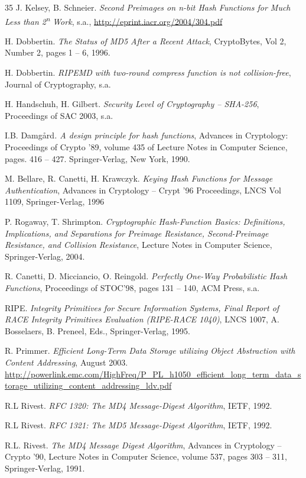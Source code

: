 \begin{thebibliography}{35}
J. Kelsey, B. Schneier. \emph{Second Preimages on n-bit Hash Functions
for Much Less than 2}\textsuperscript{\emph{n}} \emph{Work}, s.a.,
\url{http://eprint.iacr.org/2004/304.pdf}

H. Dobbertin. \emph{The Status of MD5 After a Recent Attack},
CryptoBytes, Vol 2, Number 2, pages 1 -- 6, 1996.

H. Dobbertin. \emph{RIPEMD with two-round compress function is not
collision-free}, Journal of Cryptography, s.a.

H. Handschuh, H. Gilbert. \emph{Security Level of Cryptography --
SHA-256}, Proceedings of SAC 2003, s.a.

I.B. Damgård\emph{. A design principle for hash functions}, Advances in
Cryptology: Proceedings of Crypto '89, volume 435 of Lecture Notes in
Computer Science, pages. 416 -- 427. Springer-Verlag, New York, 1990.

M. Bellare, R. Canetti, H. Krawczyk. \emph{Keying Hash Functions for
Message Authentication}, Advances in Cryptology -- Crypt '96
Proceedings, LNCS Vol 1109, Springer-Verlag, 1996

P. Rogaway, T. Shrimpton. \emph{Cryptographic Hash-Function Basics:
Definitions, Implications, and Separations for Preimage Resistance,
Second-Preimage Resistance, and Collision Resistance}, Lecture Notes in
Computer Science, Springer-Verlag, 2004.

R. Canetti, D. Micciancio, O. Reingold. \emph{Perfectly One-Way
Probabilistic Hash Functions}, Proceedings of STOC'98, pages 131 -- 140,
ACM Press, s.a.

RIPE. \emph{Integrity Primitives for Secure Information Systems, Final
Report of RACE Integrity Primitives Evaluation (RIPE-RACE 1040)}, LNCS
1007, A. Bosselaers, B. Preneel, Eds., Springer-Verlag, 1995.

R. Primmer. \emph{Efficient Long-Term Data Storage utilizing Object
Abstraction with Content Addressing}, August 2003.
\url{http://powerlink.emc.com/HighFreq/P_PL_h1050_efficient_long_term_data_storage_utilizing_content_addressing_ldv.pdf}

R.L Rivest. \emph{RFC 1320: The MD4 Message-Digest Algorithm}, IETF,
1992.

R.L Rivest. \emph{RFC 1321: The MD5 Message-Digest Algorithm}, IETF,
1992.

R.L. Rivest. \emph{The MD4 Message Digest Algorithm}, Advances in
Cryptology -- Crypto '90, Lecture Notes in Computer Science, volume 537,
pages 303 -- 311, Springer-Verlag, 1991.


\end{thebibliography}

